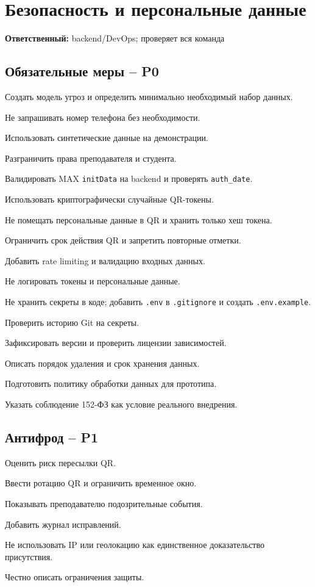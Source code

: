 \documentclass[11pt,a4paper]{article}
\newcommand{\PZero}{\textcolor{PZero}{\textbf{P0}}}
\newcommand{\POne}{\textcolor{POne}{\textbf{P1}}}
\newcommand{\owner}[1]{\textcolor{Muted}{\textbf{Ответственный:} #1}}
\newcommand{\code}[1]{\texttt{#1}}
\begin{document}
\section{Безопасность и персональные данные}
\owner{backend/DevOps; проверяет вся команда}

\subsection{Обязательные меры -- \PZero}
\begin{tasklist}
  \item Создать модель угроз и определить минимально необходимый набор данных.
  \item Не запрашивать номер телефона без необходимости.
  \item Использовать синтетические данные на демонстрации.
  \item Разграничить права преподавателя и студента.
  \item Валидировать MAX \code{initData} на backend и проверять \code{auth\_date}.
  \item Использовать криптографически случайные QR-токены.
  \item Не помещать персональные данные в QR и хранить только хеш токена.
  \item Ограничить срок действия QR и запретить повторные отметки.
  \item Добавить rate limiting и валидацию входных данных.
  \item Не логировать токены и персональные данные.
  \item Не хранить секреты в коде; добавить \code{.env} в \code{.gitignore} и создать \code{.env.example}.
  \item Проверить историю Git на секреты.
  \item Зафиксировать версии и проверить лицензии зависимостей.
  \item Описать порядок удаления и срок хранения данных.
  \item Подготовить политику обработки данных для прототипа.
  \item Указать соблюдение 152-ФЗ как условие реального внедрения.
\end{tasklist}

\subsection{Антифрод -- \POne}
\begin{tasklist}
  \item Оценить риск пересылки QR.
  \item Ввести ротацию QR и ограничить временное окно.
  \item Показывать преподавателю подозрительные события.
  \item Добавить журнал исправлений.
  \item Не использовать IP или геолокацию как единственное доказательство присутствия.
  \item Честно описать ограничения защиты.
\end{tasklist}
\end{document}
